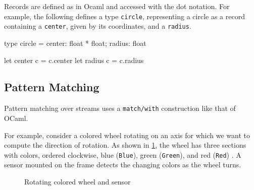 \documentclass[11pt,titlepage,twoside]{report}
\makeatletter
\newcommand{\zls}[1]{{\@span{class="zelusinline"}#1}}
\newcommand{\zls}[1]{\texttt{#1}}
\renewcommand{\zls}[1]{\texttt{#1}}
\newcommand{\ocaml}{{\sf OCaml}}
\makeatother
\begin{document}
Records are defined as in Ocaml and accessed with the dot notation. For 
example,
the following defines a type \zls{circle}, representing a circle as a record 
containing a \zls{center}, given by its coordinates, and a \zls{radius}.
\begin{chklisting}
type circle = { center: float * float; radius: float }

let center c = c.center
let radius c = c.radius
\end{chklisting}
  
\subsection{Pattern Matching\label{patternmatch}} %

Pattern matching over streams uses a \zls{match/with} construction like that 
of \ocaml.

For example, consider a colored wheel rotating on an axis for which we want 
to compute the direction of rotation.
As shown in \cref{colorwheel}, the wheel has three sections with colors, 
ordered clockwise, blue (\zls{Blue}), green (\zls{Green}), and red 
(\zls{Red}) .
A sensor mounted on the frame detects the changing colors as the wheel 
turns.

\begin{figure}[t]
\centering%
\caption{Rotating colored wheel and sensor\label{colorwheel}}
\end{figure}
\end{document}
